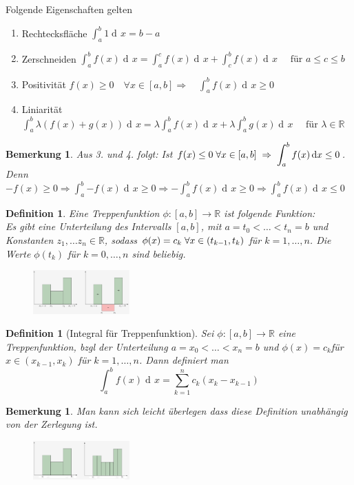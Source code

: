 \documentclass[a4paper,titlepage,oneside]{article}
\def\R{\ensuremath{\mathbb{R}} }
\newcommand{\der}{\operatorname{d\!}{}}
\def\fa{\ensuremath{\forall}}
\def\sp{\hspace{0,1cm}}
\newcommand{\integral}[4][x]{\ensuremath{\int_{#2}^{#3}{#4\der #1}}}
\newcommand{\intAB}[2][x]{\integral[#1]{a}{b}{#2}}
\theoremstyle{thmstyle}
\newtheorem{defi}[satz]{Definition}
\newtheorem{bem}[satz]{Bemerkung}
\theoremstyle{subthmstyle}
\begin{document}
Folgende Eigenschaften gelten
\begin{enumerate}
\item Rechtecksfläche $ \displaystyle   \intAB{1} = b - a$
\item Zerschneiden $ \displaystyle   \intAB{f(x)} = \integral{a}{c}{f(x)} + \integral{c}{b}{f(x)} \quad \text{ für } a \le c \le b $
\item Positivität $ \displaystyle  f(x) \ge 0 \quad \fa x \in [a,b] \Rightarrow \quad \intAB{f(x)} \ge 0$
\item Liniarität $ \displaystyle \intAB{\lambda (f(x) + g(x))} = \lambda \intAB{f(x)} + \lambda \intAB{g(x)} \quad \text{ für } \lambda \in \R$
\end{enumerate}

\begin{bem}
Aus 3. und 4. folgt: Ist $ \displaystyle f(x) \le 0 \sp \fa x \in [a,b] \sp \Rightarrow \sp \intAB{f(x)} \le 0$. Denn $ \displaystyle -f(x) \ge 0 \Rightarrow \intAB{-f(x)} \ge 0 \Rightarrow -\intAB{f(x)} \ge 0 \Rightarrow \intAB{f(x)} \le 0$
\end{bem}

\begin{defi}
Eine Treppenfunktion $\phi : [a,b] \to \R$ ist folgende Funktion: \\
Es gibt eine Unterteilung des Intervalls $[a,b]$, mit $a = t_0 < \dots < t_n = b$ und Konstanten $ z_1, \dots z_n \in \R$, sodass $\phi(x) = c_k \sp \fa x\in (t_{k-1},t_k) $ für $k = 1,\dots, n$. Die Werte $\phi(t_k) $ für $k = 0,\dots, n$ sind beliebig.
\begin{figure}[ht]\centering
 \includegraphics[width=0.33\textwidth]{images/treppenfunktion.png}
\end{figure}
\end{defi}

\begin{defi}[Integral für Treppenfunktion]
Sei $\phi : [a,b] \to \R$ eine Treppenfunktion, bzgl der Unterteilung $a = x_0 < \dots < x_n = b$ und $\phi(x) = c_k $für $x \in (x_{k-1}, x_k) $ für $k = 1,\dots, n$. Dann definiert man \[ \intAB{f(x)} = \sum_{k=1}^{n}{c_k(x_k - x_{k-1})} \]
\end{defi}

\begin{bem}
Man kann sich leicht überlegen dass diese Definition unabhängig von der Zerlegung ist.
\begin{figure}[ht]\centering
 \includegraphics[width=0.33\textwidth]{images/treppenfunktion_zerlegung.png}
\end{figure}
\end{bem}
\end{document}

